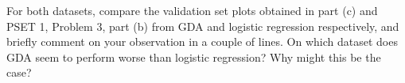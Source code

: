 \item {}
For both datasets, compare the validation set plots obtained in part (c) and PSET 1, Problem 3, part (b)
from GDA and logistic regression respectively, and briefly comment on your observation
in a couple of lines.
On which dataset does GDA seem to perform worse than logistic regression? Why might this be the case?

